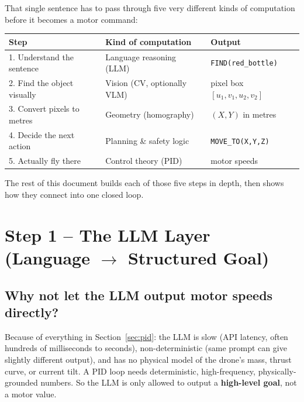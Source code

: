 \documentclass[11pt,a4paper]{article}
\begin{document}
That single sentence has to pass through five very different kinds of computation before it
becomes a motor command:

\begin{center}
\small
\begin{tabular}{lll}
\toprule
\textbf{Step} & \textbf{Kind of computation} & \textbf{Output} \\
\midrule
1. Understand the sentence & Language reasoning (LLM) & \texttt{FIND(red\_bottle)} \\
2. Find the object visually & Vision (CV, optionally VLM) & pixel box $[u_1,v_1,u_2,v_2]$ \\
3. Convert pixels to metres & Geometry (homography) & $(X,Y)$ in metres \\
4. Decide the next action & Planning \& safety logic & \texttt{MOVE\_TO(X,Y,Z)} \\
5. Actually fly there & Control theory (PID) & motor speeds \\
\bottomrule
\end{tabular}
\end{center}

The rest of this document builds each of those five steps in depth, then shows how they connect
into one closed loop.

\section{Step 1 -- The LLM Layer (Language $\to$ Structured Goal)}

\subsection{Why not let the LLM output motor speeds directly?}
Because of everything in Section~\ref{sec:pid}: the LLM is slow (API latency, often
hundreds of milliseconds to seconds), non-deterministic (same prompt can give slightly different
output), and has no physical model of the drone's mass, thrust curve, or current tilt. A PID loop
needs deterministic, high-frequency, physically-grounded numbers. So the LLM is only allowed to
output a \textbf{high-level goal}, not a motor value.

\begin{center}
\end{center}
\end{document}
